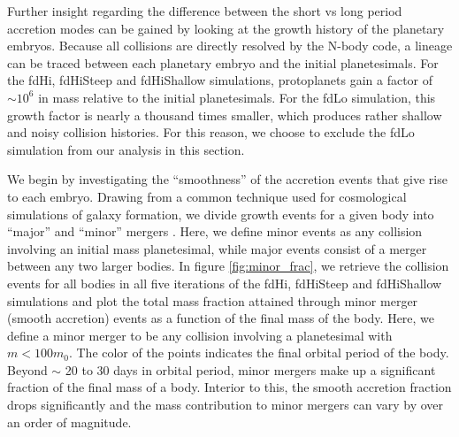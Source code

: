 \documentclass[twocolumn,linenumbers]{aastex63}
\begin{document}
Further insight regarding the difference between the short vs long period accretion modes can be gained by looking at the 
growth history of the planetary embryos. Because all collisions are directly resolved by the N-body code, a lineage can be 
traced between each planetary embryo and the initial
planetesimals. For the fdHi, fdHiSteep and fdHiShallow
  simulations, protoplanets gain a factor of $\sim 10^6$ in mass
  relative to the initial planetesimals. For the fdLo simulation, this growth factor is nearly a thousand times smaller, which produces rather shallow and noisy collision histories. For this reason, we choose to exclude the fdLo simulation from our analysis in this section.

We begin by investigating the ``smoothness'' of the accretion events
that give rise to each embryo. Drawing from a common technique used
for cosmological simulations of galaxy formation, we divide growth events for
a given body into ``major'' and ``minor'' mergers \citep{kauffmann93, murali02, lhullier12}. 
Here, we define minor events as any collision involving an initial mass 
planetesimal, while major events consist of a merger between any two larger bodies.
In figure \ref{fig:minor_frac}, we retrieve the collision events for all bodies in all five iterations of the fdHi, fdHiSteep and fdHiShallow
simulations and plot the total mass fraction attained through minor merger (smooth accretion) events as a function of the final mass of the body. Here, we define a minor merger
to be any collision involving a planetesimal with $m < 100 m_{0}$. The color of the
points indicates the final orbital period of the body. Beyond $\sim$ 20 to 30 days in orbital period, minor mergers make up a significant fraction of the final mass of a body. Interior to this, the smooth accretion fraction drops significantly and the mass contribution to minor mergers can vary by over an order of magnitude.
\end{document}
